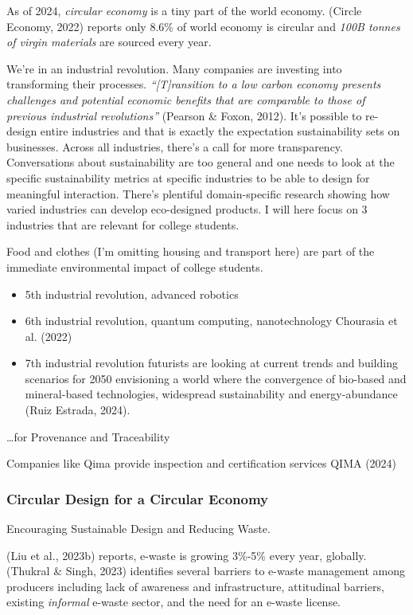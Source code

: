 \documentclass[
  letterpaper,
  DIV=11,
  numbers=noendperiod]{scrartcl}
\providecommand{\tightlist}{%
  \setlength{\itemsep}{0pt}\setlength{\parskip}{0pt}}\usepackage{longtable,booktabs,array}
\begin{document}
As of 2024, \emph{circular economy} is a tiny part of the world economy.
(Circle Economy, 2022) reports only 8.6\% of world economy is circular
and \emph{100B tonnes of virgin materials} are sourced every year.

We're in an industrial revolution. Many companies are investing into
transforming their processes. \emph{``{[}T{]}ransition to a low carbon
economy presents challenges and potential economic benefits that are
comparable to those of previous industrial revolutions''} (Pearson \&
Foxon, 2012). It's possible to re-design entire industries and that is
exactly the expectation sustainability sets on businesses. Across all
industries, there's a call for more transparency. Conversations about
sustainability are too general and one needs to look at the specific
sustainability metrics at specific industries to be able to design for
meaningful interaction. There's plentiful domain-specific research
showing how varied industries can develop eco-designed products. I will
here focus on 3 industries that are relevant for college students.

Food and clothes (I'm omitting housing and transport here) are part of
the immediate environmental impact of college students.

\begin{itemize}
\tightlist
\item
  5th industrial revolution, advanced robotics
\item
  6th industrial revolution, quantum computing, nanotechnology Chourasia
  et al. (2022)
\item
  7th industrial revolution futurists are looking at current trends and
  building scenarios for 2050 envisioning a world where the convergence
  of bio-based and mineral-based technologies, widespread sustainability
  and energy-abundance (Ruiz Estrada, 2024).
\end{itemize}

\ldots for Provenance and Traceability

Companies like Qima provide inspection and certification services QIMA
(2024)

\subsubsection{Circular Design for a Circular
Economy}\label{circular-design-for-a-circular-economy}

Encouraging Sustainable Design and Reducing Waste.

(Liu et al., 2023b) reports, e-waste is growing 3\%-5\% every year,
globally. (Thukral \& Singh, 2023) identifies several barriers to
e-waste management among producers including lack of awareness and
infrastructure, attitudinal barriers, existing \emph{informal} e-waste
sector, and the need for an e-waste license.
\end{document}

